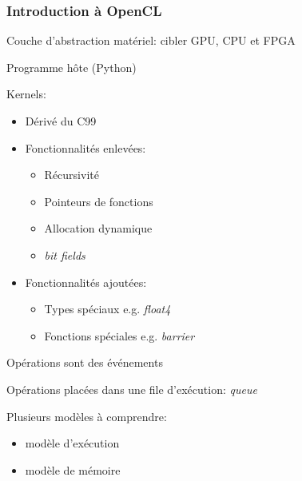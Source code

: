 \begin{frame}
    \frametitle{Introduction à OpenCL}  

    Couche d'abstraction matériel: cibler GPU, CPU et FPGA\pause{}
    \vspace{10pt}

    Programme hôte (Python)\pause{}

    Kernels:\pause{}
    \begin{itemize}
        \item Dérivé du C99\pause{}
        \item Fonctionnalités enlevées:\pause{}
            \begin{itemize}
                \item Récursivité
                \item Pointeurs de fonctions
                \item Allocation dynamique
                \item \textit{bit fields}
            \end{itemize}\pause{}
        \item Fonctionnalités ajoutées:\pause{}
            \begin{itemize}
                \item Types spéciaux e.g. \textit{float4}
                \item Fonctions spéciales e.g. \textit{barrier}
            \end{itemize}
    \end{itemize}\pause{}
    \vspace{10pt}

    Opérations sont des événements

    Opérations placées dans une file d'exécution: \textit{queue}\pause{}
    \vspace{10pt}

    Plusieurs modèles à comprendre:\pause{}
    \begin{itemize}
        \item modèle d'exécution
        \item modèle de mémoire
    \end{itemize}
\end{frame}

